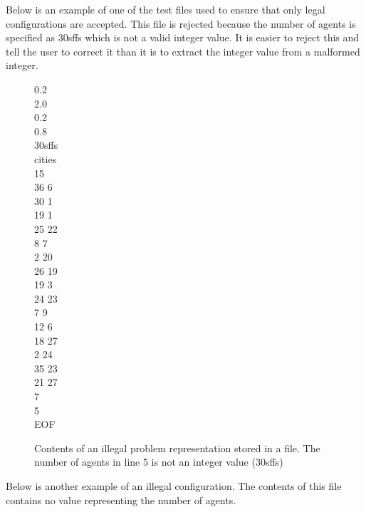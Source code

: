 Below is an example of one of the test files used to ensure that only legal configurations are accepted. This file is rejected because the number of agents is specified as 30sffs which is not a valid integer value. It is easier to reject this and tell the user to correct it than it is to extract the integer value from a malformed integer.

\begin{figure}[H]
0.2 \\
2.0 \\
0.2 \\
0.8 \\
30sffs \\
cities \\
15 \\
36 6 \\
30 1 \\
19 1 \\
25 22 \\
8 7 \\
2 20 \\
26 19 \\
19 3 \\
24 23 \\
7 9 \\
12 6 \\
18 27 \\
2 24 \\
35 23 \\
21 27 \\
7 \\
5 \\
EOF
\caption{Contents of an illegal problem representation stored in a file. The number of agents in line 5 is not an integer value (30sffs)}
\label{invalidConfigagentsNFE}
\end{figure}

Below is another example of an illegal configuration. The contents of this file contains no value representing the number of agents.

